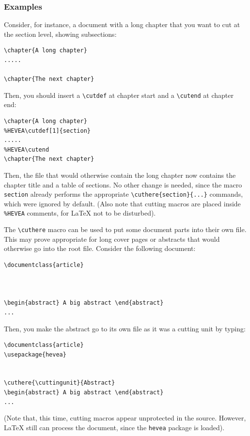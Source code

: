 \subsubsection{Examples}

Consider, for instance, a  document with a long chapter
that you want to cut at the section level, showing subsections:
\begin{verbatim}
\chapter{A long chapter}
.....

\chapter{The next chapter}
\end{verbatim}
Then, you should insert a \verb+\cutdef+ at chapter start and a
\verb+\cutend+ at chapter end:
\begin{verbatim}
\chapter{A long chapter}
%HEVEA\cutdef[1]{section}
.....
%HEVEA\cutend
\chapter{The next chapter}
\end{verbatim}
Then, the file
that would otherwise contain the long chapter now contains the chapter
title and a table of sections.
No other change is needed, since the macro \verb+section+ already
performs the appropriate \verb+\cuthere{section}{...}+ commands,
which were ignored by default.
(Also note that cutting macros are placed inside \verb+%HEVEA+ comments,
for \LaTeX{} not to be disturbed).

The \verb+\cuthere+ macro can be used to put some document parts into
their own file.
This may prove appropriate for long cover pages or abstracts that would
otherwise go into the root file.
Consider the following document:
\begin{verbatim}
\documentclass{article}



\begin{abstract} A big abstract \end{abstract}
...
\end{verbatim}
Then, you make the abstract go to its own file as it was a cutting
unit by typing:
\begin{verbatim}
\documentclass{article}
\usepackage{hevea}


\cuthere{\cuttingunit}{Abstract}
\begin{abstract} A big abstract \end{abstract}
...
\end{verbatim}
(Note that, this time, cutting macros appear unprotected in the
source. However, \LaTeX{} still can process the document, since the
\texttt{hevea} package is loaded).

